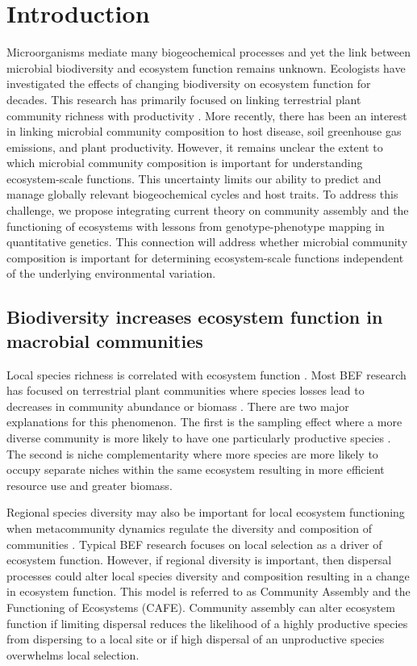 \documentclass{article}
\begin{document}
\section{Introduction} 


Microorganisms mediate many biogeochemical processes and yet the link between
microbial biodiversity and ecosystem function remains unknown. 
Ecologists have investigated the effects of changing
biodiversity on ecosystem function for decades. This research has primarily
focused on linking terrestrial plant community richness with productivity
\citep{hooper2005}. More recently, there has been an interest in linking
microbial community composition to host disease, soil greenhouse gas emissions,
and plant productivity. However, it remains unclear the extent to which 
microbial community composition is important for understanding ecosystem-scale
functions.  This uncertainty limits our ability to predict and manage 
globally relevant biogeochemical cycles and host traits. To
address this challenge, we propose integrating current theory on community
assembly and the functioning of ecosystems with lessons from genotype-phenotype
mapping in quantitative genetics. This connection will address
whether microbial community
composition is important for determining ecosystem-scale functions independent
of the underlying environmental variation.

\subsection{Biodiversity increases ecosystem function in macrobial communities}

Local species richness is correlated with ecosystem function
\citep{hooper2005}. Most BEF research has focused on terrestrial plant 
communities where species losses lead to decreases in community abundance or biomass
\citep{naeem2003}. There are
two major explanations for this phenomenon. The first is the sampling effect
where a more diverse community is more likely to have one particularly
productive species \citep{cardinale2006}. The second is niche complementarity where more species are
more likely to occupy separate niches within the same ecosystem resulting in
more efficient resource use and greater biomass.

Regional species diversity may also be important for
local ecosystem functioning when metacommunity dynamics regulate the
diversity and composition of communities \citep{leibold2017}. 
Typical BEF research focuses on local selection
as a driver of ecosystem function. However, if regional
diversity is important, then dispersal processes could alter local species diversity and composition resulting in
a change in ecosystem function. This model is referred to as Community Assembly
and the Functioning of Ecosystems (CAFE). Community assembly can alter ecosystem
function if limiting dispersal reduces the likelihood of a highly productive
species from dispersing to a local site or if high dispersal of an unproductive
species overwhelms local selection.
\end{document}
